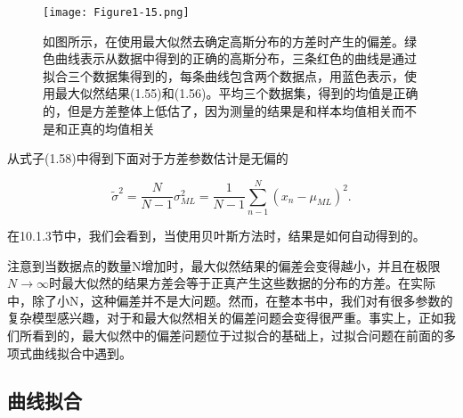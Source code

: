 	\begin{figure}[t]
		\parbox{.5\textwidth}{\caption{  如图所示，在使用最大似然去确定高斯分布的方差时产生的偏差。绿色曲线表示从数据中得到的正确的高斯分布，三条红色的曲线是通过拟合三个数据集得到的，每条曲线包含两个数据点，用蓝色表示，使用最大似然结果(1.55)和(1.56)。平均三个数据集，得到的均值是正确的，但是方差整体上低估了，因为测量的结果是和样本均值相关而不是和正真的均值相关 }}
		\parbox{.5\textwidth}{\texttt{[image: Figure1-15.png]}}
	\end{figure}
	
	从式子(1.58)中得到下面对于方差参数估计是无偏的
	
	\begin{equation}
	\tilde{\sigma}^2 = \frac{N}{N - 1}\sigma_{ML}^2 = \frac{1}{N - 1} \sum_{n - 1}^{N}(x_n - \mu_{ML})^2.
	\end{equation}
	
	在10.1.3节中，我们会看到，当使用贝叶斯方法时，结果是如何自动得到的。
	
	注意到当数据点的数量N增加时，最大似然结果的偏差会变得越小，并且在极限$N \to \infty$时最大似然的结果方差会等于正真产生这些数据的分布的方差。在实际中，除了小N，这种偏差并不是大问题。然而，在整本书中，我们对有很多参数的复杂模型感兴趣，对于和最大似然相关的偏差问题会变得很严重。事实上，正如我们所看到的，最大似然中的偏差问题位于过拟合的基础上，过拟合问题在前面的多项式曲线拟合中遇到。
	
\subsection{曲线拟合}
	